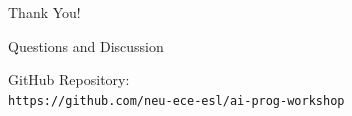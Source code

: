 \documentclass[xcolor=dvipsnames, aspectratio=169]{beamer}
\begin{document}
\begin{frame}{Thank You!}
  \begin{center}
    \Large{Questions and Discussion}
    
    \vspace{2em}
    
    GitHub Repository:\\
    \texttt{https://github.com/neu-ece-esl/ai-prog-workshop}
  \end{center}
\end{frame}
\end{document}
